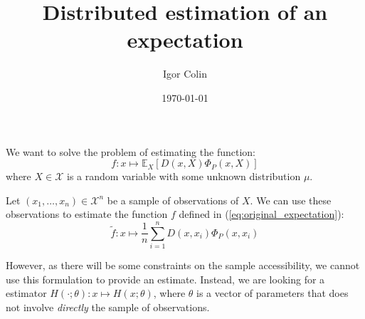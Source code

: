 \documentclass[a4paper]{article}
\author{Igor Colin}
\date{\today}
\title{Distributed estimation of an expectation}
\begin{document}
We want to solve the problem of estimating the function:
\begin{equation}
    \label{eq:original_expectation}
    f : x \mapsto
    \mathbb{E}_X\left[ D(x,X) \Phi_P(x,X) \right]
\end{equation}
where $X \in \mathcal{X}$ is a random variable with some unknown distribution
$\mu$.

Let $(x_1, \ldots, x_n) \in \mathcal{X}^n$ be a sample of observations of $X$.
We can use these observations to estimate the function $f$ defined in
(\ref{eq:original_expectation}):
\begin{equation}
    \tilde{f} : x \mapsto
    \frac{1}{n} \sum_{i=1}^n D(x,x_i) \Phi_P(x,x_i)
\end{equation}

However, as there will be some constraints on the sample accessibility, we
cannot use this formulation to provide an estimate. Instead, we are looking
for a estimator $H(\cdot;\mathbb{\theta}) : x \mapsto H(x;\mathbb{\theta})$,
where $\mathbb{\theta}$ is a vector of parameters that does not involve
\emph{directly} the sample of observations.
\end{document}
